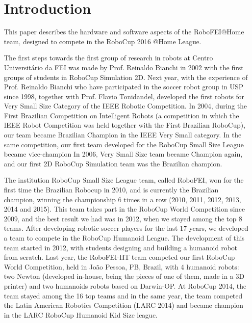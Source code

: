 \section{Introduction}

This paper describes the hardware and software aspects of the RoboFEI@Home team, designed to compete in the RoboCup 2016 @Home League.

The first steps towards the first group of research in robots at Centro Universitário da FEI was made by Prof. Reinaldo Bianchi in 2002 with the first groups of students in RoboCup Simulation 2D. Next year, with the experience of Prof. Reinaldo Bianchi who have participated in the soccer robot group in USP since 1998, together with Prof. Flavio Tonidandel, developed the first robots for Very Small Size Category of the IEEE Robotic Competition. In 2004, during the First Brazilian Competition on Intelligent Robots (a competition in which the IEEE Robot Competition was held together with the First Brazilian RoboCup), our team became Brazilian Champion in the IEEE Very Small category. In the same competition, our first team developed for the RoboCup Small Size League became vice-champion In 2006, Very Small Size team became Champion again, and our first 2D RoboCup Simulation team was the Brazilian champion.

The institution RoboCup Small Size League team, called RoboFEI, won for the first time the Brazilian Robocup in 2010, and is currently the Brazilian champion, winning the championship 6 times in a row (2010, 2011, 2012, 2013, 2014 and 2015). This team takes part in the RoboCup World Competition since 2009, and the best result we had was in 2012, when we stayed among the top 8 teams. After developing robotic soccer players for the last 17 years, we developed a team to compete in the RoboCup Humanoid League. The development of this team started in 2012, with students designing and building a humanoid robot from scratch. Last year, the RoboFEI-HT team competed our first RoboCup World Competition, held in João Pessoa, PB, Brazil, with 4 humanoid robots: two Newton (developed in-house, being the pieces of one of them, made in a 3D printer) and two humanoids robots based on Darwin-OP. At RoboCup 2014, the team stayed among the 16 top teams and in the same year, the team competed the Latin American Robotics Competition (LARC 2014) and became champion in the LARC RoboCup Humanoid Kid Size league.

